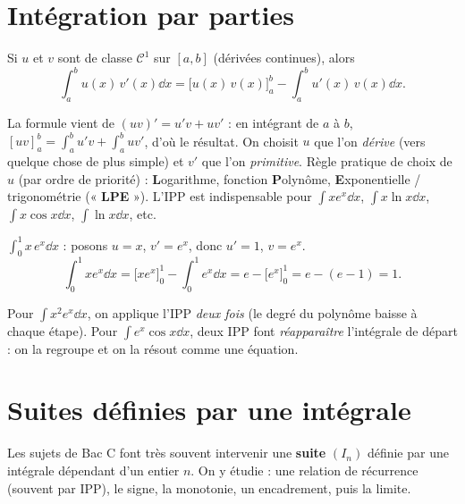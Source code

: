 \section{Intégration par parties}

\begin{theoreme}
Si $u$ et $v$ sont de classe $\mathcal C^1$ sur $[a,b]$ (dérivées continues), alors
\[
\int_a^b u(x)\,v'(x)\dd x=\big[u(x)\,v(x)\big]_a^b-\int_a^b u'(x)\,v(x)\dd x.
\]
\end{theoreme}

\begin{remarque}
La formule vient de $(uv)'=u'v+uv'$ : en intégrant de $a$ à $b$,
$[uv]_a^b=\int_a^b u'v+\int_a^b uv'$, d'où le résultat. On choisit $u$ que l'on \emph{dérive}
(vers quelque chose de plus simple) et $v'$ que l'on \emph{primitive}. Règle pratique de choix
de $u$ (par ordre de priorité) : \textbf{L}ogarithme, fonction \textbf{P}olynôme,
\textbf{E}xponentielle / trigonométrie (« \textbf{LPE} »). L'IPP est indispensable pour
$\int x e^{x}\dd x$, $\int x\ln x\dd x$, $\int x\cos x\dd x$, $\int\ln x\dd x$, etc.
\end{remarque}

\begin{exemple}
$\displaystyle\int_0^1 x\,e^{x}\dd x$ : posons $u=x$, $v'=e^{x}$, donc $u'=1$, $v=e^{x}$.
\[
\int_0^1 x e^{x}\dd x=\big[x e^{x}\big]_0^1-\int_0^1 e^{x}\dd x=e-\big[e^{x}\big]_0^1=e-(e-1)=1.
\]
\end{exemple}

\begin{remarque}
Pour $\int x^2 e^x\dd x$, on applique l'IPP \emph{deux fois} (le degré du polynôme baisse à chaque
étape). Pour $\int e^x\cos x\dd x$, deux IPP font \emph{réapparaître} l'intégrale de départ :
on la regroupe et on la résout comme une équation.
\end{remarque}

\section{Suites définies par une intégrale}

Les sujets de Bac C font très souvent intervenir une \textbf{suite} $(I_n)$ définie par une
intégrale dépendant d'un entier $n$. On y étudie : une relation de récurrence (souvent par IPP),
le signe, la monotonie, un encadrement, puis la limite.

